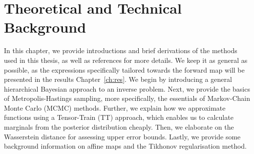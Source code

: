 \chapter{Theoretical and Technical Background}
\label{ch:background}
In this chapter, we provide introductions and brief derivations of the methods used in this thesis, as well as references for more details. We keep it as general as possible, as the expressions specifically tailored towards the forward map will be presented in the results Chapter~\ref{ch:res}.
We begin by introducing a general hierarchical Bayesian approach to an inverse problem.
Next, we provide the basics of Metropolis-Hastings sampling, more specifically, the essentials of Markov-Chain Monte Carlo (MCMC) methods.
Further, we explain how we approximate functions using a Tensor-Train (TT) approach, which enables us to calculate marginals from the posterior distribution cheaply.
Then, we elaborate on the Wasserstein distance for assessing upper error bounds.
Lastly, we provide some background information on affine maps and the Tikhonov regularisation method.



